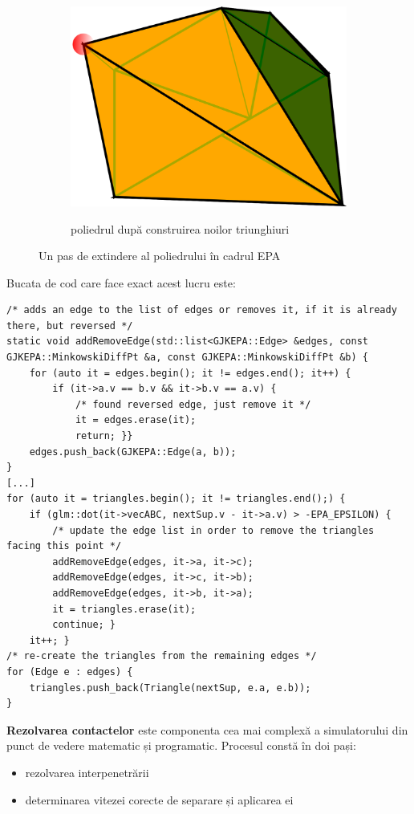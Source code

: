\documentclass[12pt,a4paper]{report}
\begin{document}
\begin{figure}[H]
\begin{subfigure}[h]{0.32\textwidth}
 		\includegraphics[width=\textwidth]{pics/EPA2.png}
 		\label{fig:EPA2}
 		\caption{poliedrul după construirea noilor triunghiuri}
 		\vfill
	\end{subfigure}
	\caption{Un pas de extindere al poliedrului în cadrul EPA}
\end{figure}

Bucata de cod care face exact acest lucru este:
\begin{lstlisting}[style=myC++]
/* adds an edge to the list of edges or removes it, if it is already there, but reversed */
static void addRemoveEdge(std::list<GJKEPA::Edge> &edges, const GJKEPA::MinkowskiDiffPt &a, const GJKEPA::MinkowskiDiffPt &b) {
	for (auto it = edges.begin(); it != edges.end(); it++) {
		if (it->a.v == b.v && it->b.v == a.v) {
			/* found reversed edge, just remove it */
			it = edges.erase(it);
			return;	}}
	edges.push_back(GJKEPA::Edge(a, b));
}
[...]
for (auto it = triangles.begin(); it != triangles.end();) {
	if (glm::dot(it->vecABC, nextSup.v - it->a.v) > -EPA_EPSILON) {
		/* update the edge list in order to remove the triangles facing this point */
		addRemoveEdge(edges, it->a, it->c);
		addRemoveEdge(edges, it->c, it->b);
		addRemoveEdge(edges, it->b, it->a);
		it = triangles.erase(it);
		continue; }
	it++; }
/* re-create the triangles from the remaining edges */
for (Edge e : edges) {
	triangles.push_back(Triangle(nextSup, e.a, e.b));
}
\end{lstlisting}


\textbf{Rezolvarea contactelor} este componenta cea mai complexă a simulatorului din punct de vedere matematic și programatic. Procesul constă în doi pași:
\begin{itemize}
	\item rezolvarea interpenetrării
	\item determinarea vitezei corecte de separare și aplicarea ei
\end{itemize}
\end{document}
